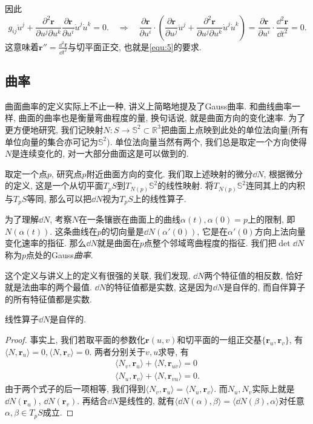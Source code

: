 \documentclass[./main.tex]{subfiles}
\begin{document}
因此
\[
    g_{ij}\ddot u^j+\frac{\partial^2\mathbf{r}}{\partial u^j\partial u^k}\frac{\partial\mathbf{r}}{\partial u^i}\dot u^j\dot u^k=0.\quad \Longrightarrow\quad\frac{\partial\mathbf{r}}{\partial u^i}\cdot\left(\frac{\partial\mathbf{r}}{\partial u^j}\ddot u^j+\frac{\partial^2\mathbf{r}}{\partial u^j\partial u^k}\dot u^j\dot u^k\right)=\frac{\partial\mathbf{r}}{\partial u^i}\cdot\frac{\dd^2\mathbf{r}}{\dd t^2}=0.
\]
这意味着\(\mathbf{r}''=\frac{\dd^2\mathbf{r}}{\dd t^2}\)与切平面正交, 也就是\eqref{equ:5}的要求.
\subsection{曲率}
曲面曲率的定义实际上不止一种, 讲义上简略地提及了Gauss曲率. 和曲线曲率一样, 曲面的曲率也是衡量弯曲程度的量, 换句话说, 就是曲面方向的变化速率. 为了更方便地研究, 我们记映射\(N:S\to\mathbb{S}^2\subset\mathbb{R}^3\)把曲面上点映到此处的单位法向量(所有单位向量的集合亦可记为\(\mathbb{S}^2\)). 单位法向量当然有两个, 我们总是取定一个方向使得\(N\)是连续变化的, 对一大部分曲面这是可以做到的. 

取定一个点\(p\), 研究点\(p\)附近曲面方向的变化. 我们取上述映射的微分\(\dd N\), 根据微分的定义, 这是一个从切平面\(T_{p}S\)到\(T_{N(p)}\mathbb{S}^2\)的线性映射. 将\(T_{N(p)}\mathbb{S}^2\)连同其上的内积与\(T_pS\)等同, 那么可以把\(\dd N\)视为\(T_pS\)上的线性算子.

为了理解\(\dd N\), 考察\(N\)在一条镶嵌在曲面上的曲线\(\alpha(t),\alpha(0)=p\)上的限制, 即\(N(\alpha(t))\). 这条曲线在\(p\)的切向量是\(\dd N(\alpha'(0))\), 它是在\(\alpha'(0)\)方向上法向量变化速率的指征. 那么\(\dd N\)就是曲面在\(p\)点整个邻域弯曲程度的指征. 我们把\(\det\dd N\)称为\(p\)点处的Gauss\textit{曲率}.

这个定义与讲义上的定义有很强的关联, 我们发现, \(\dd N\)两个特征值的相反数, 恰好就是法曲率的两个最值. \(\dd N\)的特征值都是实数, 这是因为\(\dd N\)是自伴的, 而自伴算子的所有特征值都是实数.
\begin{proposition}
    线性算子\(\dd N\)是自伴的.
\end{proposition}
\begin{proof}
事实上, 我们若取平面的参数化\(\mathbf{r}(u,v)\)和切平面的一组正交基\(\{\mathbf{r}_u,\mathbf{r}_v\}\), 有\(\langle N,\mathbf{r}_u\rangle=0,\langle N,\mathbf{r}_v\rangle=0\). 两者分别关于\(v,u\)求导, 有
\begin{gather*}
    \langle N_v,\mathbf{r}_u\rangle+\langle N,\mathbf{r}_{uv}\rangle=0\\
    \langle N_u,\mathbf{r}_v\rangle+\langle N,\mathbf{r}_{vu}\rangle=0.
\end{gather*}
由于两个式子的后一项相等, 我们得到\(\langle N_v,\mathbf{r}_u\rangle=\langle N_u,\mathbf{r}_v\rangle\). 而\(N_u,N_v\)实际上就是\(\dd N(\mathbf{r}_u)\), \(\dd N(\mathbf{r}_v)\). 再结合\(\dd N\)是线性的, 就有\(\langle \dd N(\alpha),\beta\rangle=\langle\dd N(\beta),\alpha\rangle\)对任意\(\alpha,\beta\in T_pS\)成立.
\end{proof}
\end{document}
